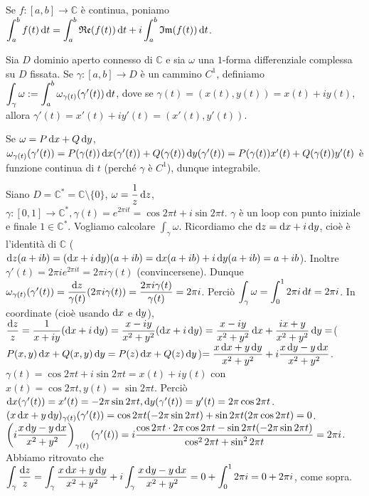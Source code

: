 Se $f:[a, b] \longrightarrow \mathbb{C}$ è continua, poniamo $\displaystyle \int_a^b f(t)\mathop{}\!\mathrm{d} t=\int_a^b \mathfrak{Re}(f(t))\mathop{}\!\mathrm{d} t+i\int_a^b \mathfrak{Im}(f(t))\mathop{}\!\mathrm{d} t$.

\begin{defn} \label{int_gamma_no1}
  Sia $D$ dominio aperto connesso di $\mathbb{C}$ e sia $\omega$ una $1$-forma differenziale complessa su $D$ fissata. Se $\gamma:[a, b] \longrightarrow D$ è un cammino $C^1$, definiamo $\displaystyle \int_{\gamma} \omega:=\int_a^b \omega_{\gamma(t)}(\gamma'(t))\mathop{}\!\mathrm{d} t$, dove se $\gamma(t)=(x(t), y(t))=x(t)+iy(t)$, allora $\gamma'(t)=x'(t)+iy'(t)=(x'(t), y'(t))$.
\end{defn}

\begin{oss}
  Se $\omega=P\mathop{}\!\mathrm{d} x+Q\mathop{}\!\mathrm{d} y$, $\omega_{\gamma(t)}(\gamma'(t))=P(\gamma(t))\mathop{}\!\mathrm{d} x(\gamma'(t))+Q(\gamma(t))\mathop{}\!\mathrm{d} y(\gamma'(t))=P(\gamma(t))x'(t)+Q(\gamma(t))y'(t)$ è funzione continua di $t$ (perché $\gamma$ è $C^1$), dunque integrabile.
\end{oss}

\begin{ex}
  Siano $D=\mathbb{C}^*=\mathbb{C}\setminus\{0\}$, $\omega=\dfrac{1}{z}\mathop{}\!\mathrm{d} z$, $\gamma:[0, 1] \longrightarrow \mathbb{C}^*, \gamma(t)=e^{2\pi i t}=\cos{2\pi t}+i\sin{2\pi t}$.
  $\gamma$ è un loop con punto iniziale e finale $1 \in \mathbb{C}^*$. Vogliamo calcolare $\displaystyle \int_{\gamma} \omega$. Ricordiamo che $\mathop{}\!\mathrm{d} z=\mathop{}\!\mathrm{d} x+i\mathop{}\!\mathrm{d} y$, cioè è l'identità di $\mathbb{C}$ ($\mathop{}\!\mathrm{d} z(a+ib)=(\mathop{}\!\mathrm{d} x+i\mathop{}\!\mathrm{d} y)(a+ib)=\mathop{}\!\mathrm{d} x(a+ib)+i\mathop{}\!\mathrm{d} y(a+ib)=a+ib$). Inoltre $\gamma'(t)=2\pi ie^{2\pi it}=2\pi i\gamma(t)$ (convincersene).
  Dunque $\omega_{\gamma(t)}(\gamma'(t))=\dfrac{\mathop{}\!\mathrm{d} z}{\gamma(t)}(2\pi i\gamma(t))=\dfrac{2\pi i \gamma(t)}{\gamma(t)}=2\pi i$. Perciò $\displaystyle \int_{\gamma} \omega=\int_0^1 2\pi i \mathop{}\!\mathrm{d} t=2\pi i$.
  In coordinate (cioè usando $\mathop{}\!\mathrm{d} x$ e $\mathop{}\!\mathrm{d} y$), $\dfrac{\mathop{}\!\mathrm{d} z}{z}=\dfrac{1}{x+iy}(\mathop{}\!\mathrm{d} x+i\mathop{}\!\mathrm{d} y)=\dfrac{x-iy}{x^2+y^2}(\mathop{}\!\mathrm{d} x+i\mathop{}\!\mathrm{d} y)=\dfrac{x-iy}{x^2+y^2}\mathop{}\!\mathrm{d} x+\dfrac{ix+y}{x^2+y^2}\mathop{}\!\mathrm{d} y=$($P(x, y) \mathop{}\!\mathrm{d} x+Q(x, y)\mathop{}\!\mathrm{d} y=P(z) \mathop{}\!\mathrm{d} x+Q(z)\mathop{}\!\mathrm{d} y$)$=\dfrac{x\mathop{}\!\mathrm{d} x+y\mathop{}\!\mathrm{d} y}{x^2+y^2}+i\dfrac{x\mathop{}\!\mathrm{d} y-y \mathop{}\!\mathrm{d} x}{x^2+y^2}$.
  $\gamma(t)=\cos{2\pi t}+i\sin{2\pi t}=x(t)+iy(t)$ con $x(t)=\cos{2\pi t}, y(t)=\sin{2\pi t}$. Perciò $\mathop{}\!\mathrm{d} x(\gamma'(t))=x'(t)=-2\pi\sin{2\pi t}, \mathop{}\!\mathrm{d} y(\gamma'(t))=y'(t)=2\pi\cos{2\pi t}$.
  $(x\mathop{}\!\mathrm{d} x+y\mathop{}\!\mathrm{d} y)_{\gamma(t)}(\gamma'(t))=\cos{2\pi t}(-2\pi\sin{2\pi t})+\sin{2\pi t}(2\pi\cos{2\pi t})=0$. \\
  $\left(i\dfrac{x\mathop{}\!\mathrm{d} y-y\mathop{}\!\mathrm{d} x}{x^2+y^2}\right)_{\gamma(t)}(\gamma'(t))=i\dfrac{\cos{2\pi t}\cdot2\pi\cos{2\pi t}-\sin{2\pi t}(-2\pi\sin{2\pi t})}{\cos^2{2\pi t}+\sin^2{2\pi t}}=2\pi i$.
  Abbiamo ritrovato che $\displaystyle \int_{\gamma} \dfrac{\mathop{}\!\mathrm{d} z}{z}=\int_{\gamma} \dfrac{x\mathop{}\!\mathrm{d} x+y\mathop{}\!\mathrm{d} y}{x^2+y^2}+i\int_{\gamma} \dfrac{x\mathop{}\!\mathrm{d} y-y\mathop{}\!\mathrm{d} x}{x^2+y^2}=0+\int_0^1 2\pi i=0+2\pi i$, come sopra.
\end{ex}

